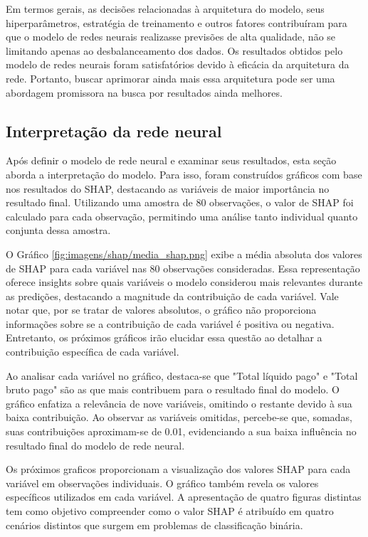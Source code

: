Em termos gerais, as decisões relacionadas à arquitetura do modelo, seus hiperparâmetros, 
estratégia de treinamento e outros fatores contribuíram para que o modelo de redes neurais realizasse previsões
de alta qualidade, não se limitando apenas ao desbalanceamento dos dados. Os resultados obtidos pelo modelo de redes
neurais foram satisfatórios devido à eficácia da arquitetura da rede. Portanto, buscar aprimorar ainda mais essa 
arquitetura pode ser uma abordagem promissora na busca por resultados ainda melhores.

\subsection{Interpretação da rede neural}


Após definir o modelo de rede neural e examinar seus resultados, esta seção aborda a interpretação do modelo. 
Para isso, foram construídos gráficos com base nos resultados do SHAP, destacando as variáveis de maior importância
 no resultado final. Utilizando uma amostra de 80 observações, o valor de SHAP foi calculado para cada observação, 
 permitindo uma análise tanto individual quanto conjunta dessa amostra.



O Gráfico \ref{fig:imagens/shap/media_shap.png} exibe a média absoluta dos valores de SHAP para cada variável nas
80 observações consideradas. Essa representação oferece insights sobre quais variáveis o modelo considerou mais
relevantes durante as predições, destacando a magnitude da contribuição de cada variável. Vale notar que, por 
se tratar de valores absolutos, o gráfico não proporciona informações sobre se a contribuição de cada variável
é positiva ou negativa. Entretanto, os próximos gráficos irão elucidar essa questão ao detalhar a contribuição 
específica de cada variável.

Ao analisar cada variável no gráfico, destaca-se que "Total líquido pago" e "Total bruto pago" são as que mais
contribuem para o resultado final do modelo. O gráfico enfatiza a relevância de nove variáveis, omitindo 
o restante devido à sua baixa contribuição. Ao observar as variáveis omitidas, percebe-se que, somadas, 
suas contribuições aproximam-se de 0.01, evidenciando a sua baixa influência no resultado final do modelo de rede neural.

Os próximos graficos proporcionam a visualização dos valores SHAP para cada variável em observações individuais.
O gráfico também revela os valores específicos utilizados em cada variável. A apresentação de quatro figuras distintas tem
como objetivo compreender como o valor SHAP é atribuído em quatro cenários distintos que surgem em problemas de classificação binária.

